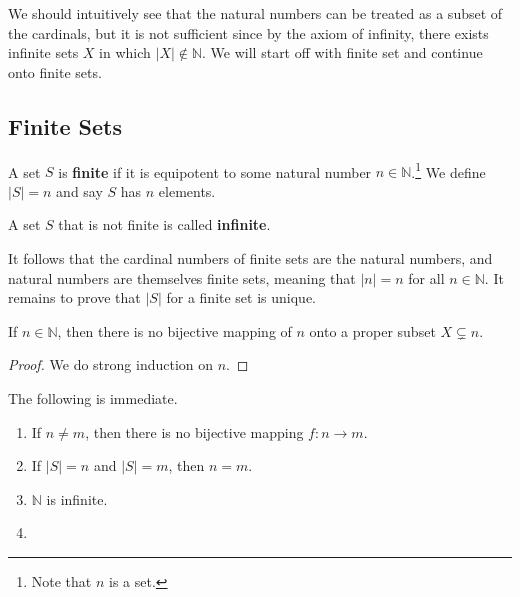   We should intuitively see that the natural numbers can be treated as a subset of the cardinals, but it is not sufficient since by the axiom of infinity, there exists infinite sets $X$ in which $|X| \not\in \mathbb{N}$. We will start off with finite set and continue onto finite sets. 

\subsection{Finite Sets} 

  \begin{definition}
    A set $S$ is \textbf{finite} if it is equipotent to some natural number $n \in \mathbb{N}$.\footnote{Note that $n$ is a set.} We define $|S| = n$ and say $S$ has $n$ elements. 
  \end{definition} 

  \begin{definition}
    A set $S$ that is not finite is called \textbf{infinite}. 
  \end{definition}

  It follows that the cardinal numbers of finite sets are the natural numbers, and natural numbers are themselves finite sets, meaning that $|n| = n$ for all $n \in \mathbb{N}$. It remains to prove that $|S|$ for a finite set is unique. 

  \begin{lemma}
    If $n \in \mathbb{N}$, then there is no bijective mapping of $n$ onto a proper subset $X \subsetneq n$. 
  \end{lemma}
  \begin{proof}
    We do strong induction on $n$. 
  \end{proof}

  \begin{corollary}
    The following is immediate. 
    \begin{enumerate}
      \item If $n \neq m$, then there is no bijective mapping $f: n \to m$. 
      \item If $|S| = n$ and $|S| = m$, then $n = m$. 
      \item $\mathbb{N}$ is infinite. 
      \item 
    \end{enumerate}
  \end{corollary}

